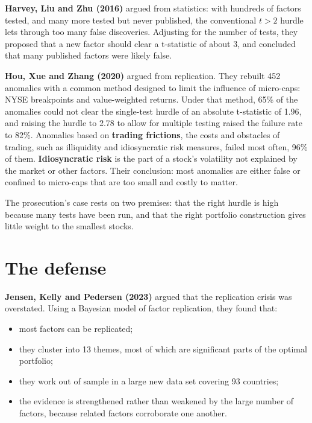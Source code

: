 \textbf{Harvey, Liu and Zhu (2016)} argued from statistics: with hundreds of factors tested, and many more tested but never published, the conventional $t > 2$ hurdle lets through too many false discoveries. Adjusting for the number of tests, they proposed that a new factor should clear a t-statistic of about 3, and concluded that many published factors were likely false.

\textbf{Hou, Xue and Zhang (2020)} argued from replication. They rebuilt 452 anomalies with a common method designed to limit the influence of micro-caps: NYSE breakpoints and value-weighted returns. Under that method, 65\% of the anomalies could not clear the single-test hurdle of an absolute t-statistic of 1.96, and raising the hurdle to 2.78 to allow for multiple testing raised the failure rate to 82\%. Anomalies based on \textbf{trading frictions}, the costs and obstacles of trading, such as illiquidity and idiosyncratic risk measures, failed most often, 96\% of them. \textbf{Idiosyncratic risk} is the part of a stock's volatility not explained by the market or other factors. Their conclusion: most anomalies are either false or confined to micro-caps that are too small and costly to matter.

The prosecution's case rests on two premises: that the right hurdle is high because many tests have been run, and that the right portfolio construction gives little weight to the smallest stocks.

\section{The defense}
\label{sec:10-defense}

\textbf{Jensen, Kelly and Pedersen (2023)} argued that the replication crisis was overstated. Using a Bayesian model of factor replication, they found that:

\begin{itemize}
  \item most factors can be replicated;
  \item they cluster into 13 themes, most of which are significant parts of the optimal portfolio;
  \item they work out of sample in a large new data set covering 93 countries;
  \item the evidence is strengthened rather than weakened by the large number of factors, because related factors corroborate one another.
\end{itemize}

